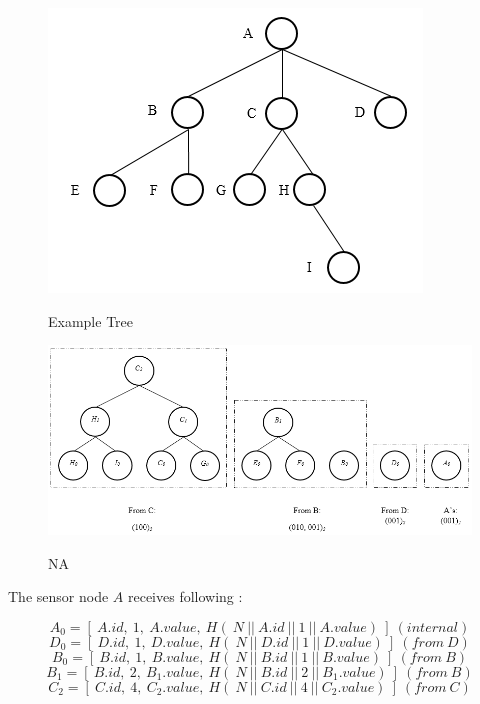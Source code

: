 	\begin{figure}[hp]
		\centering
		\includegraphics[scale = 0.7]{images/example-tree.png}\\
		\caption{Example Tree}
	\end{figure}

	\newpage
	\begin{figure}[hp]
		\centering
		\includegraphics[scale = 0.7]{images/commitment-tree-example-1.png}\\
		\caption{NA}
	\end{figure}

	The sensor node $A$ receives following \payloads:

	\begin{equation}
		A_{0} = [\ A.id,\ 1,\ A.value,\ H  (\ N\ ||\ A.id\ ||\ 1\ ||\ A.value)\ ]\ (internal)
	\end{equation}
	\begin{equation}
		D_{0} = [\ D.id,\ 1,\ D.value,\ H(\ N\ ||\ D.id\ ||\ 1\ ||\ D.value)\ ]\ (from\ D)
	\end{equation}
	\begin{equation}
		B_{0} = [\ B.id,\ 1,\ B.value,\ H(\ N\ ||\ B.id\ ||\ 1\ ||\ B.value)\ ]\ (from\ B)
	\end{equation}
	\begin{equation}
		B_{1} = [\ B.id,\ 2,\ B_{1}.value,\ H(\ N\ ||\ B.id\ ||\ 2\ ||\ B_{1}.value)\ ]\ (from\ B)
	\end{equation}
	\begin{equation}
		C_{2} = [\ C.id,\ 4,\ C_{2}.value,\ H(\ N\ ||\ C.id\ ||\ 4\ ||\ C_{2}.value)\ ]\ (from\ C)
	\end{equation}
	

